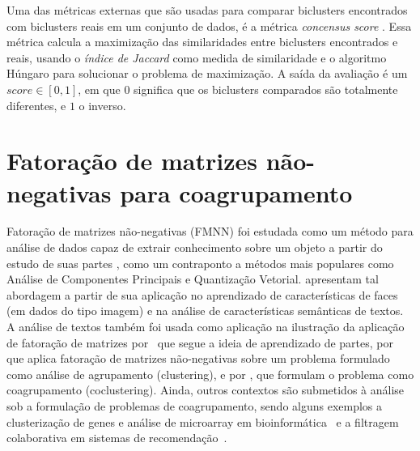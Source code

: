 \documentclass[
    12pt,                %
    oneside,            %
    a4paper,            %
    english,            %
    brazil                %
    ]{abntex2ppgsi}
\begin{document}
Uma das métricas externas que são usadas para comparar biclusters encontrados com biclusters reais em um conjunto de dados, é a métrica \textit{concensus score} \cite{Hochreiter2010}. Essa métrica calcula a maximização das similaridades entre biclusters encontrados e reais, usando o \textit{índice de Jaccard} como medida de similaridade e o algoritmo Húngaro para solucionar o problema de maximização. A saída da avaliação é um $\textit{score} \in [0,1]$, em que $0$ significa que os biclusters comparados são totalmente diferentes, e $1$ o inverso.


\chapter{Fatoração de matrizes não-negativas para coagrupamento}
\label{ch:fatoracao}



Fatoração de matrizes não-negativas (FMNN) foi estudada como um método para análise de dados capaz de extrair conhecimento sobre um objeto a partir do estudo de suas partes \cite{lee99}, como um contraponto a métodos mais populares como Análise de Componentes Principais e Quantização Vetorial.  apresentam tal abordagem a partir de sua aplicação no aprendizado de características de faces (em dados do tipo imagem) e na análise de características semânticas de textos.  A análise de textos também foi usada como aplicação na ilustração da aplicação de fatoração de matrizes por~ que segue a ideia de aprendizado de partes, por  que aplica fatoração de matrizes não-negativas sobre um problema formulado como análise de agrupamento (clustering), e por , que formulam o problema como coagrupamento (coclustering). Ainda, outros contextos são submetidos à análise sob a formulação de problemas de coagrupamento, sendo alguns exemplos a clusterização de genes e análise de microarray em bioinformática~\cite{Kluger2003} e a filtragem colaborativa em sistemas de recomendação~\cite{SalMnih08}.
\end{document}
